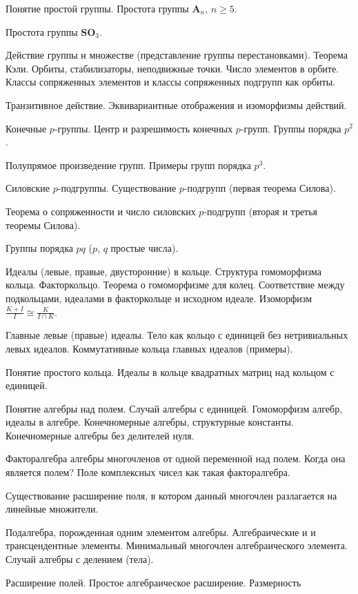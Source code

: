 \documentclass[a4paper]{article}
\begin{document}
\begin{nums}{-1}
Понятие простой группы. Простота группы $\mathbf{A}_n$, $n\ge 5$.
\item
Простота группы $\mathbf{SO}_3$.
\item
Действие группы н множестве (представление группы перестановками).
Теорема Кэли. Орбиты, стабилизаторы, неподвижные точки. Число
элементов в орбите. Классы сопряженных элементов и классы
сопряженных подгрупп как орбиты.
\item
Транзитивное действие. Эквивариантные отображения и изоморфизмы действий.
\item
Конечные $p$-группы. Центр и разрешимость конечных $p$-групп.
Группы порядка $p^2$.
\item
Полупрямое произведение групп. Примеры групп порядка $p^3$.
\item
Силовские $p$-подгруппы. Существование $p$-подгрупп (первая
теорема Силова).
\item
Теорема о сопряженности и число силовских $p$-подгрупп (вторая и
третья теоремы Силова).
\item
Группы порядка $pq$ ($p$, $q$ простые числа).
\item
Идеалы (левые, правые, двусторонние) в кольце. Структура
гомоморфизма кольца. Факторкольцо. Теорема о гомоморфизме для
колец. Соответствие между подкольцами, идеалами в факторкольце и
исходном идеале. Изоморфизм $\frac{K+I}{I}\cong \frac{K}{I\cap
K}$.
\item
Главные левые (правые) идеалы. Тело как кольцо с единицей без
нетривиальных левых идеалов. Коммутативные кольца главных идеалов
(примеры).
\item
Понятие простого кольца. Идеалы в кольце квадратных матриц над
кольцом с единицей.
\item
Понятие алгебры над полем. Случай алгебры с единицей. Гомоморфизм
алгебр, идеалы в алгебре. Конечномерные алгебры, структурные
константы. Конечномерные алгебры без делителей нуля.
\item
Факторалгебра алгебры многочленов от одной переменной над полем.
Когда она является полем? Поле комплексных чисел как такая
факторалгебра.
\item
Существование расширение поля, в котором данный многочлен
разлагается на линейные множители.
\item
Подалгебра, порожденная одним элементом алгебры. Алгебраические и
и трансцендентные элементы. Минимальный многочлен алгебраического
элемента. Случай алгебры с делением (тела).
\item
Расширение полей. Простое алгебраическое расширение. Размерность

\end{nums}
\end{document}
